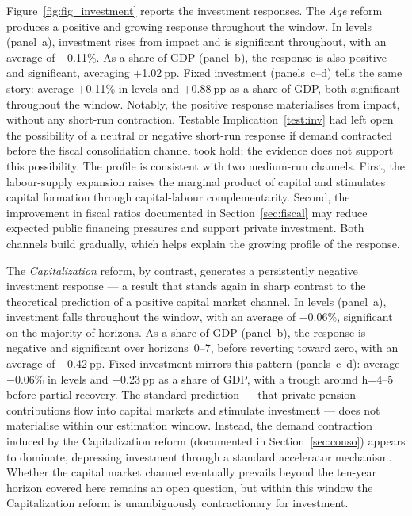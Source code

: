 \documentclass[11pt,english,a4paper, twoside, authoryear]{article}
\begin{document}
Figure~\ref{fig:fig_investment} reports the investment responses. The \textit{Age} reform produces a positive and growing response throughout the window. In levels (panel~a), investment rises from impact and is significant throughout, with an average of $+$0.11\%. As a share of GDP (panel~b), the response is also positive and significant, averaging $+$1.02$~$pp. Fixed investment (panels~c--d) tells the same story: average $+$0.11\% in levels and $+$0.88$~$pp as a share of GDP, both significant throughout the window. Notably, the positive response materialises from impact, without any short-run contraction. Testable Implication~\ref{test:inv} had left open the possibility of a neutral or negative short-run response if demand contracted before the fiscal consolidation channel took hold; the evidence does not support this possibility. The profile is consistent with two medium-run channels. First, the labour-supply expansion raises the marginal product of capital and stimulates capital formation through capital-labour complementarity. Second, the improvement in fiscal ratios documented in Section~\ref{sec:fiscal} may reduce expected public financing pressures and support private investment. Both channels build gradually, which helps explain the growing profile of the response.

The \textit{Capitalization} reform, by contrast, generates a persistently negative investment response --- a result that stands again in sharp contrast to the theoretical prediction of a positive capital market channel. In levels (panel~a), investment falls throughout the window, with an average of $-$0.06\%, significant on the majority of horizons. As a share of GDP (panel~b), the response is negative and significant over horizons~0--7, before reverting toward zero, with an average of $-$0.42$~$pp. Fixed investment mirrors this pattern (panels~c--d): average $-$0.06\% in levels and $-$0.23$~$pp as a share of GDP, with a trough around h=4--5 before partial recovery. The standard prediction --- that private pension contributions flow into capital markets and stimulate investment --- does not materialise within our estimation window. Instead, the demand contraction induced by the Capitalization reform (documented in Section~\ref{sec:conso}) appears to dominate, depressing investment through a standard accelerator mechanism. Whether the capital market channel eventually prevails beyond the ten-year horizon covered here remains an open question, but within this window the Capitalization reform is unambiguously contractionary for investment.
\end{document}
